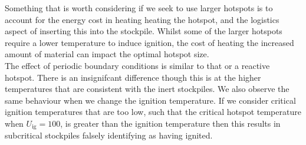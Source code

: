 Something that is worth considering if we seek to use larger hotspots is to account for the energy cost in heating heating the hotspot, and the logistics aspect of inserting this into the stockpile. Whilst some of the larger hotspots require a lower temperature to induce ignition, the cost of heating the increased amount of material can impact the optimal hotspot size.\\

The effect of periodic boundary conditions is similar to that or a reactive hotspot. There is an insignifcant difference though this is at the higher temperatures that are consistent with the inert stockpiles. We also observe the same behaviour when we change the ignition temperature. If we consider critical ignition temperatures that are too low, such that the critical hotspot temperature when $U_{\text{ig}}=100$, is greater than the ignition temperature then this results in subcritical stockpiles falsely identifying as having ignited.\\

 

